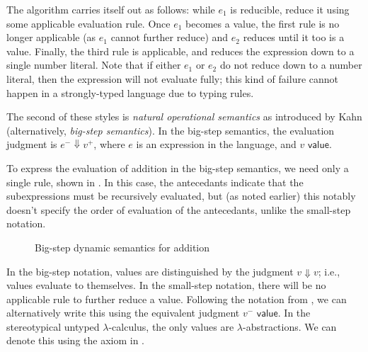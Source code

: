The algorithm carries itself out as follows: while $e_1$ is reducible, reduce it using some applicable evaluation rule. Once $e_1$ becomes a value, the first rule is no longer applicable (as $e_1$ cannot further reduce) and $e_2$ reduces until it too is a value. Finally, the third rule is applicable, and reduces the expression down to a single number literal. Note that if either $e_1$ or $e_2$ do not reduce down to a number literal, then the expression will not evaluate fully; this kind of failure cannot happen in a strongly-typed language due to typing rules.

The second of these styles is \textit{natural operational semantics} as introduced by Kahn \cite{Kahn1987NaturalS} (alternatively, \textit{big-step semantics}). In the big-step semantics, the evaluation judgment is $e^-\Downarrow v^+$, where $e$ is an expression in the language, and $v\textsf{ value}$.

To express the evaluation of addition in the big-step semantics, we need only a single rule, shown in . In this case, the antecedants indicate that the subexpressions must be recursively evaluated, but (as noted earlier) this notably doesn't specify the order of evaluation of the antecedants, unlike the small-step notation.

\begin{figure}
  \centering
  \begin{mdframed}
    \begin{singlespace}
      \begin{mathpar}
      \end{mathpar}
    \end{singlespace}
  \end{mdframed}
  \caption{Big-step dynamic semantics for addition}
  \label{fig:big-step-addition}
\end{figure}

In the big-step notation, values are distinguished by the judgment $v\Downarrow v$; i.e., values evaluate to themselves. In the small-step notation, there will be no applicable rule to further reduce a value. Following the notation from \cite{conf/popl/Hazelnut17,conf/popl/HazelnutLive19}, we can alternatively write this using the equivalent judgment $v^-\textsf{ value}$. In the stereotypical untyped $\lambda$-calculus, the only values are $\lambda$-abstractions. We can denote this using the axiom in .

